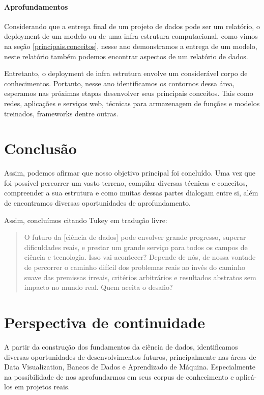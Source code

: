 \subsubsection{Aprofundamentos}
Considerando que a entrega final de um projeto de dados pode ser um relatório, o deployment de um modelo ou de uma infra-estrutura computacional, como vimos na seção \ref{principais.conceitos}, nesse ano demonstramos a entrega de um modelo, neste relatório também podemos encontrar aspectos de um relatório de dados.

Entretanto, o deployment de infra estrutura envolve um considerável corpo de conhecimentos. Portanto, nesse ano identificamos os contornos dessa área, esperamos nas próximas etapas desenvolver seus principais conceitos. Tais como redes, aplicações e serviços web, técnicas para armazenagem de funções e modelos treinados, frameworks dentre outras. 

\chapter{Conclusão}
Assim, podemos afirmar que nosso objetivo principal foi concluído. Uma vez que foi possível percorrer um vasto terreno, compilar diversas técnicas e conceitos, compreender a sua estrutura e como muitas dessas partes dialogam entre si, além de encontramos diversas oportunidades de aprofundamento. 

Assim, concluímos citando Tukey \cite{FoDA} em tradução livre:
\begin{quote}
O futuro da [ciência de dados] pode envolver grande progresso, superar dificuldades reais, e prestar um grande serviço para todos os campos de ciência e tecnologia. Isso vai acontecer? Depende de nós, de nossa vontade de percorrer o caminho difícil dos problemas reais ao invés do caminho suave das premissas irreais, critérios arbitrários e resultados abstratos sem impacto no mundo real. Quem aceita o desafio?
\end{quote}

\chapter{Perspectiva de continuidade}
A partir da construção dos fundamentos da ciência de dados, identificamos diversas oportunidades de desenvolvimentos futuros, principalmente nas áreas de Data Visualization, Bancos de Dados e Aprendizado de Máquina. Especialmente na possibilidade de nos aprofundarmos em seus corpus de conhecimento e aplicá-los em projetos reais. 
